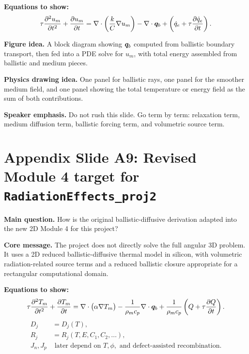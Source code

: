 \documentclass[11pt]{article}
\begin{document}
\textbf{Equations to show:}
\begin{equation*}
\tau\frac{\partial^2 u_m}{\partial t^2}+\frac{\partial u_m}{\partial t}
=\nabla\cdot\left(\frac{k}{C}\nabla u_m\right)-\nabla\cdot\bm{q}_b
+\left(\dot{q}_e+\tau\frac{\partial \dot{q}_e}{\partial t}\right).
\end{equation*}

\textbf{Figure idea.} A block diagram showing \(\bm{q}_b\) computed from ballistic boundary transport, then fed into a PDE solve for \(u_m\), with total energy assembled from ballistic and medium pieces.

\textbf{Physics drawing idea.} One panel for ballistic rays, one panel for the smoother medium field, and one panel showing the total temperature or energy field as the sum of both contributions.

\textbf{Speaker emphasis.} Do not rush this slide. Go term by term: relaxation term, medium diffusion term, ballistic forcing term, and volumetric source term.

\section{Appendix Slide A9: Revised Module 4 target for \texttt{RadiationEffects\_proj2}}
\begin{physicsbox}
\textbf{Main question.} How is the original ballistic-diffusive derivation adapted into the new 2D Module 4 for this project?
\end{physicsbox}

\textbf{Core message.} The project does not directly solve the full angular 3D problem. It uses a 2D reduced ballistic-diffusive thermal model in silicon, with volumetric radiation-related source terms and a reduced ballistic closure appropriate for a rectangular computational domain.

\textbf{Equations to show:}
\begin{equation*}
\tau\frac{\partial^2 T_m}{\partial t^2}+\frac{\partial T_m}{\partial t}
=\nabla\cdot\bigl(\alpha\nabla T_m\bigr)
-\frac{1}{\rho_m c_p}\nabla\cdot\bm{q}_b
+\frac{1}{\rho_m c_p}\left(Q+\tau\frac{\partial Q}{\partial t}\right).
\end{equation*}
\begin{align*}
D_j &= D_j(T),\\
R_j &= R_j(T,E,C_1,C_2,\dots),\\
J_n, J_p &\text{ later depend on } T,\phi,\text{ and defect-assisted recombination.}
\end{align*}
\end{document}
